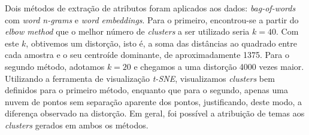\documentclass[10pt,twocolumn,letterpaper]{article}
\begin{document}
Dois métodos de extração de atributos foram aplicados aos dados: \textit{bag-of-words} com \textit{word n-grams} e \textit{word embeddings}. Para o primeiro, encontrou-se a partir do \textit{elbow method} que o melhor número de \textit{clusters} a ser utilizado seria \(k = 40\). Com este \(k\), obtivemos um distorção, isto é, a soma das distâncias ao quadrado entre cada amostra e o seu centroíde dominante, de aproximadamente 1375. Para o segundo método, adotamos \(k = 20\) e chegamos a uma distorção 4000 vezes maior. Utilizando a ferramenta de visualização \textit{t-SNE}, visualizamos \textit{clusters} bem definidos para o primeiro método, enquanto que para o segundo, apenas uma nuvem de pontos sem separação aparente dos pontos, justificando, deste modo, a diferença observado na distorção.  Em geral, foi possível a atribuição de temas aos \textit{clusters} gerados em ambos os métodos.

{\small


}
\end{document}
